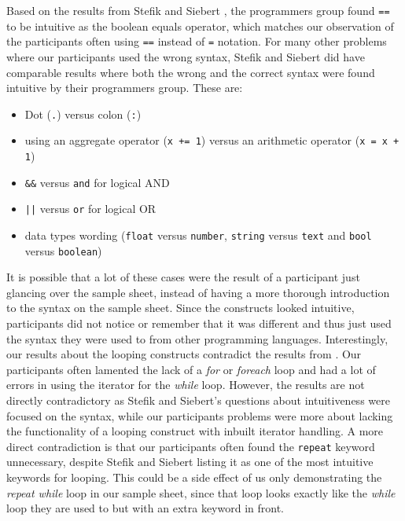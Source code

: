 \documentclass[preprint,10pt]{sigplanconf}
\begin{document}
Based on the results from Stefik and Siebert \cite{Empiricalinvestigation}, the programmers group found \lstinline!==! to be intuitive as the boolean equals operator, which matches our observation of the participants often using \lstinline!==! instead of \lstinline!=! notation. For many other problems where our participants used the wrong syntax, Stefik and Siebert \cite{Empiricalinvestigation} did have comparable results where both the wrong and the correct syntax were found intuitive by their programmers group. These are: 
\begin{itemize}
\item Dot (\lstinline!.!) versus colon (\lstinline!:!)
\item using an aggregate operator (\lstinline!x += 1!) versus an arithmetic operator (\lstinline!x = x + 1!)
\item \lstinline!&&! versus \lstinline!and! for logical AND
\item \lstinline!||! versus \lstinline!or! for logical OR
\item data types wording (\lstinline!float! versus \lstinline!number!, \lstinline!string! versus \lstinline!text! and \lstinline!bool! versus \lstinline!boolean!)
\end{itemize}

It is possible that a lot of these cases were the result of a participant just glancing over the sample sheet, instead of having a more thorough introduction to the syntax on the sample sheet. Since the constructs looked intuitive, participants did not notice or remember that it was different and thus just used the syntax they were used to from other programming languages. Interestingly, our results about the looping constructs contradict the results from \cite{Empiricalinvestigation}. Our participants often lamented the lack of a \textit{for} or \textit{foreach} loop and had a lot of errors in using the iterator for the \textit{while} loop. %
However, the results are not directly contradictory as Stefik and Siebert's questions about intuitiveness were focused on the syntax, while our participants problems were more about lacking the functionality of a looping construct with inbuilt iterator handling. A more direct contradiction is that our participants often found the \lstinline!repeat! keyword unnecessary, despite Stefik and Siebert listing it as one of the most intuitive keywords for looping. This could be a side effect of us only demonstrating the \textit{repeat while} loop in our sample sheet, since that loop looks exactly like the \textit{while} loop they are used to but with an extra keyword in front. 
\end{document}
